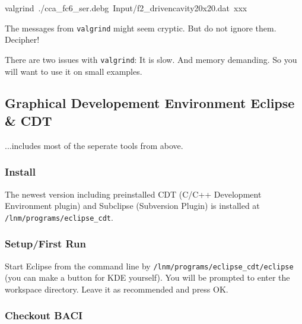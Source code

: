 \begin{lyxcode}
valgrind~./cca\_fc6\_ser.debg~Input/f2\_drivencavity20x20.dat~xxx
\end{lyxcode}
The messages from \texttt{valgrind} might seem cryptic. But do not
ignore them. Decipher!

There are two issues with \texttt{valgrind}: It is slow. And memory
demanding. So you will want to use it on small examples.


\subsection{Graphical Developement Environment Eclipse \& CDT}

...includes most of the seperate tools from above.

\subsubsection{Install}

The newest version including preinstalled CDT (C/C++ Development Environment plugin) and Subclipse (Subversion Plugin) is installed at \verb|/lnm/programs/eclipse_cdt|.

\subsubsection{Setup/First Run}
Start Eclipse from the command line by \verb|/lnm/programs/eclipse_cdt/eclipse| (you can make a button for KDE yourself).
You will be prompted to enter the workspace directory. Leave it as recommended and press OK.

\subsubsection{Checkout BACI}


